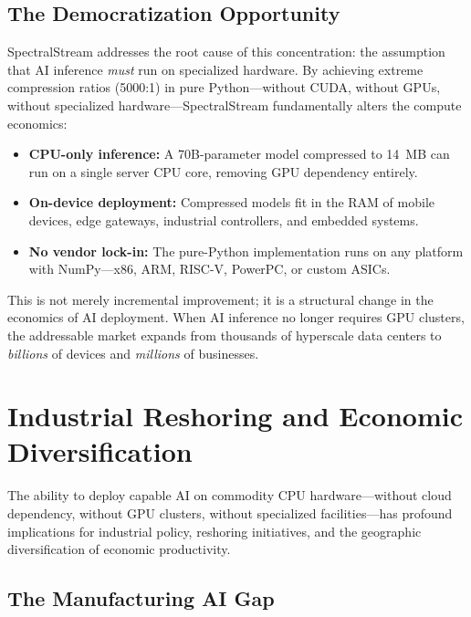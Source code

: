 \documentclass[11pt,a4paper,openright]{book}
\begin{document}
\section{The Democratization Opportunity}

SpectralStream addresses the root cause of this concentration: the assumption that AI inference \emph{must} run on specialized hardware. By achieving extreme compression ratios (5000:1) in pure Python---without CUDA, without GPUs, without specialized hardware---SpectralStream fundamentally alters the compute economics:

\begin{itemize}
	\item \textbf{CPU-only inference:} A 70B-parameter model compressed to 14~MB can run on a single server CPU core, removing GPU dependency entirely.
	\item \textbf{On-device deployment:} Compressed models fit in the RAM of mobile devices, edge gateways, industrial controllers, and embedded systems.
	\item \textbf{No vendor lock-in:} The pure-Python implementation runs on any platform with NumPy---x86, ARM, RISC-V, PowerPC, or custom ASICs.
\end{itemize}

This is not merely incremental improvement; it is a structural change in the economics of AI deployment. When AI inference no longer requires GPU clusters, the addressable market expands from thousands of hyperscale data centers to \emph{billions} of devices and \emph{millions} of businesses.

\chapter{Industrial Reshoring and Economic Diversification}
\label{ch:reshoring}

The ability to deploy capable AI on commodity CPU hardware---without cloud dependency, without GPU clusters, without specialized facilities---has profound implications for industrial policy, reshoring initiatives, and the geographic diversification of economic productivity.

\section{The Manufacturing AI Gap}
\end{document}
